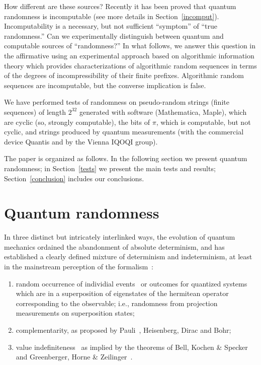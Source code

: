 \documentclass[%
 preprint,
 showpacs,
 showkeys,
 preprintnumbers,
 amsmath,amssymb,
 aps,
 prl,
  longbibliography,
 ]{revtex4-1}
\begin{document}
How different are these sources? Recently it has been proved that quantum randomness is incomputable (see more details in  Section~\ref{incomput}). Incomputability is a necessary, but not sufficient ``symptom''
of ``true randomness.''  Can we
 experimentally  distinguish between
quantum  and   computable
sources of  ``randomness?''
In what follows, we   answer this question in the affirmative using an experimental approach based on algorithmic information theory
which provides characterizations of algorithmic random sequences in terms of the degrees of incompressibility of their finite prefixes. Algorithmic random sequences are incomputable, but the converse implication is false.



We have performed tests of randomness on pseudo-random strings (finite sequences) of length $2^{32}$ generated with software
(Mathematica, Maple), which are  cyclic (so, strongly computable), the bits of $\pi$, which is computable, but not cyclic, and strings produced by quantum measurements  (with the commercial device Quantis and  by the Vienna IQOQI group).

The paper is organized as follows. In the following section we present quantum randomness;
in Section~\ref{tests} we present the main tests and results; Section~\ref{conclusion} includes our conclusions.

\section{Quantum randomness}



In three distinct but intricately interlinked ways, the evolution of quantum mechanics ordained the abandonment
of absolute determinism, and has established a clearly defined mixture of determinism and indeterminism,
at least in the mainstream perception of the formalism~\cite{jammer:89,jammer1,feynman-law,fuchs-peres,clauser-talkvie}:
\renewcommand{\labelenumi}{(\roman{enumi})}
\begin{enumerate}
\item
random occurrence of individial events~\cite{born-26-1,born-26-2} or outcomes for quantized systems
which are in a superposition of eigenstates of the hermitean operator
corresponding to the observable;
i.e., randomness from projection measurements on superposition states;
\item
complementarity, as proposed by Pauli~\cite{pauli:58}, Heisenberg, Dirac and Bohr;
\item
value indefiniteness~\cite{peres222} as implied by the theorems of Bell, Kochen \& Specker and Greenberger, Horne \& Zeilinger~\cite{mermin-93}.
\end{enumerate}
\end{document}
